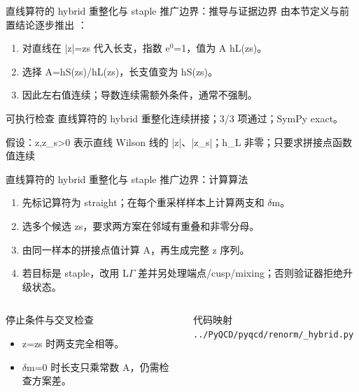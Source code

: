 \begin{frame}[t]{直线算符的 hybrid 重整化与 staple 推广边界：推导与证据边界}
\footnotesize
{}\quad 由本节定义与前置结论逐步推出 ：
\begin{enumerate}
\item 对直线在 |z|=zs 代入长支，指数 e\ensuremath{^{0}}=1，值为 A hL(zs)。
\item 选择 A=hS(zs)/\allowbreak{}hL(zs)，长支值变为 hS(zs)。
\item 因此左右值连续；导数连续需额外条件，通常不强制。
\end{enumerate}\begin{block}{可执行检查}
\quad 直线算符的 hybrid 重整化连续拼接；3/3 项通过；SymPy exact。
\par\scriptsize 假设：z,z\_s>0 表示直线 Wilson 线的 |z|、|z\_s|；h\_L 非零；只要求拼接点函数值连续
\end{block}
\end{frame}

\begin{frame}[t]{直线算符的 hybrid 重整化与 staple 推广边界：计算算法}
\footnotesize
{}\begin{enumerate}
\item 先标记算符为 straight；在每个重采样样本上计算两支和 \ensuremath{\delta}m。
\item 选多个候选 zs，要求两方案在邻域有重叠和非零分母。
\item 由同一样本的拼接点值计算 A，再生成完整 z 序列。
\item 若目标是 staple，改用 L\ensuremath{\Gamma} 差并另处理端点/\allowbreak{}cusp/\allowbreak{}mixing；否则验证器拒绝升级状态。
\end{enumerate}\begin{columns}[T,onlytextwidth]
\begin{block}{停止条件与交叉检查}\scriptsize\begin{itemize}
\item[\CheckMark] z=zs 时两支完全相等。
\item[\CheckMark] \ensuremath{\delta}m=0 时长支只乘常数 A，仍需检查方案差。
\end{itemize}\end{block}
\begin{block}{代码映射}
\scriptsize \texttt{.\allowbreak{}.\allowbreak{}/\allowbreak{}PyQCD/\allowbreak{}pyqcd/\allowbreak{}renorm/\allowbreak{}\_\allowbreak{}hybrid.\allowbreak{}py}
\end{block}\end{columns}\end{frame}

